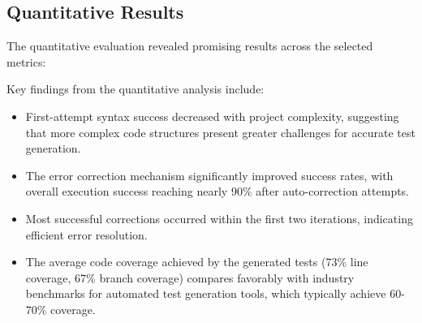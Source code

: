 \subsection{Quantitative Results}

The quantitative evaluation revealed promising results across the selected metrics:

\begin{table}[ht]
    \centering
    \caption{Test Generation Accuracy Metrics}
    \label{tab:accuracy-metrics}
\end{table}

Key findings from the quantitative analysis include:

\begin{itemize}
    \item First-attempt syntax success decreased with project complexity, suggesting that more complex code structures present greater challenges for accurate test generation.
    
    \item The error correction mechanism significantly improved success rates, with overall execution success reaching nearly 90\% after auto-correction attempts.
    
    \item Most successful corrections occurred within the first two iterations, indicating efficient error resolution.
    
    \item The average code coverage achieved by the generated tests (73\% line coverage, 67\% branch coverage) compares favorably with industry benchmarks for automated test generation tools, which typically achieve 60-70\% coverage.
\end{itemize}

